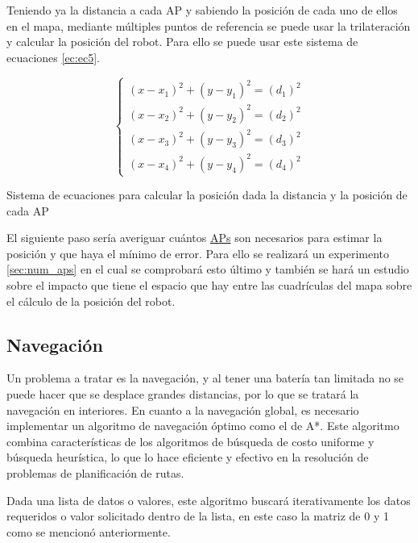 Teniendo ya la distancia a cada AP y sabiendo la posición de cada uno de ellos en el mapa, mediante múltiples puntos de referencia se puede usar la trilateración y calcular la posición del robot. Para ello se puede usar este sistema de ecuaciones \ref{ec:ec5}. 




\begin{myequation}[H]
\begin{equation}
\left\{
	\begin{array}{lcc}
		(x - x_1)^2 + (y - y_1)^2 = (d_1)^2\\
		(x - x_2)^2 + (y - y_2)^2 = (d_2)^2\\
		(x - x_3)^2 + (y - y_3)^2 = (d_3)^2 \\
		(x - x_4)^2 + (y - y_4)^2 = (d_4)^2
	\end{array}
\right.
\label{ec:ec5}
\end{equation}
\caption[Sistema de ecuaciones para calcular la posición dada la distancia y la posición de cada AP]{Sistema de ecuaciones para calcular la posición dada la distancia y la posición de cada AP}
\end{myequation}


El siguiente paso sería averiguar cuántos \hyperlink{APs}{APs} son necesarios para estimar la posición y que haya el mínimo de error. Para ello se realizará un experimento \ref{sec:num_aps} en el cual se comprobará esto último y también se hará un estudio sobre el impacto que tiene el espacio que hay entre las cuadrículas del mapa sobre el cálculo de la posición del robot.


\subsection{Navegación}
\label{subsec:navegación}

Un problema a tratar es la navegación, y al tener una batería tan limitada no se puede hacer que se desplace grandes distancias, por lo que se tratará la navegación en interiores. En cuanto a la navegación global, es necesario implementar un algoritmo de navegación óptimo como el de A*. Este algoritmo combina características de los algoritmos de búsqueda de costo uniforme y búsqueda heurística, lo que lo hace eficiente y efectivo en la resolución de problemas de planificación de rutas. 

Dada una lista de datos o valores, este algoritmo buscará iterativamente los datos requeridos o
valor solicitado dentro de la lista, en este caso la matriz de 0 y 1 como se mencionó anteriormente. 

